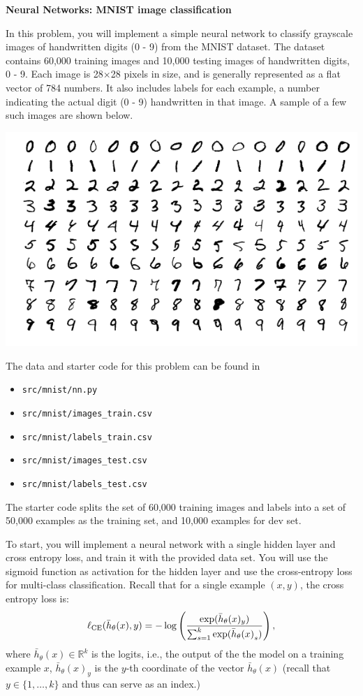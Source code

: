 \item {} {\bf Neural Networks: MNIST image classification}

In this problem, you will implement a simple neural network
to classify grayscale images of handwritten digits (0 - 9) from
the MNIST dataset. The dataset contains 60,000 training images and
10,000 testing images of handwritten digits, 0 - 9. Each image is
28$\times$28 pixels in size, and is generally represented as a flat
vector of 784 numbers. It also includes labels for each example, a number
indicating the actual digit (0 - 9) handwritten in that image. A sample of
a few such images are shown below.

\begin{center}
\includegraphics[scale=0.5]{mnist/mnist_plot}
\end{center}

The data and starter code for this problem can be found in

\begin{itemize}
\item \texttt{src/mnist/nn.py}
\item \texttt{src/mnist/images\_train.csv}
\item \texttt{src/mnist/labels\_train.csv}
\item \texttt{src/mnist/images\_test.csv}
\item \texttt{src/mnist/labels\_test.csv}
\end{itemize}

The starter code splits the set
of 60,000 training images and labels into a set of 50,000 examples as
the training set, and 10,000 examples for dev set.

To start, you will implement a neural network with a single hidden layer
and cross entropy loss, and train it with the provided data set. You will use the
sigmoid function as activation for the hidden layer and use the cross-entropy loss for multi-class classification. Recall that for a single example $(x, y)$, the cross
entropy loss is:
$$\ell_\textup{CE}(\bar{h}_{\theta}(x),y) = - \log\left(\frac{\exp(\bar{h}_{\theta}(x)_{y})}{\sum_{s=1}^{k}\exp({\bar{h}_{\theta}(x)}_s)}\right),$$
where $\bar{h}_{\theta}(x) \in \mathbb{R}^{k}$ is the logits, i.e., the output of the the model on a training example $x$, $\bar{h}_\theta(x)_y$ is the $y$-th coordinate of the vector $\bar{h}_\theta(x)$ (recall that $y\in \{1,\dots, k\}$ and thus can serve as an index.)

